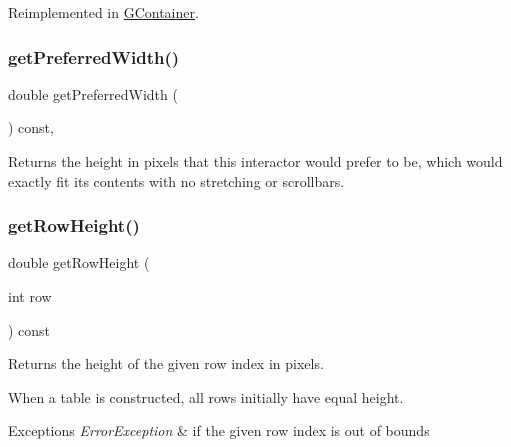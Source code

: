 Reimplemented in \mbox{\hyperlink{classGContainer_ac0fd6fc35681f935c67ad68078b354b8}{G\+Container}}.

\mbox{\label{classGInteractor_a82bca31d37700fb0e35d2743352efd5e}} 
\subsubsection{\texorpdfstring{get\+Preferred\+Width()}{getPreferredWidth()}}
{\footnotesize\ttfamily double get\+Preferred\+Width (\begin{DoxyParamCaption}{ }\end{DoxyParamCaption}) const\hspace{0.3cm}{\ttfamily [virtual]}, {\ttfamily [inherited]}}



Returns the height in pixels that this interactor would prefer to be, which would exactly fit its contents with no stretching or scrollbars. 

\mbox{\label{classGTable_a0215a742506665475b721ed12913808b}} 
\subsubsection{\texorpdfstring{get\+Row\+Height()}{getRowHeight()}}
{\footnotesize\ttfamily double get\+Row\+Height (\begin{DoxyParamCaption}\item[{int}]{row }\end{DoxyParamCaption}) const\hspace{0.3cm}{\ttfamily [virtual]}}



Returns the height of the given row index in pixels. 

When a table is constructed, all rows initially have equal height. 
\begin{DoxyExceptions}{Exceptions}
{\em Error\+Exception} & if the given row index is out of bounds \\
\hline
\end{DoxyExceptions}
\mbox{\label{classGTable_ae4b79399eefc964f783f06b6959a6a4a}} 
